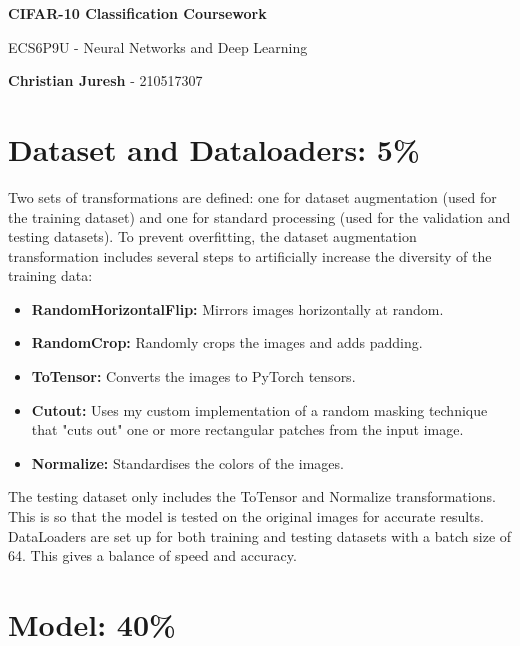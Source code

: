 \documentclass[12pt]{article}
\begin{document}
   \begin{center}
    \vspace{1.5cm}
    \vfill
       \Huge
       \textbf{CIFAR-10 Classification Coursework}

       \vspace{0.5cm}
       \LARGE
       ECS6P9U - Neural Networks and Deep Learning
        
       \large
       \vspace{0.5cm}
       \textbf{Christian Juresh} - 210517307
       \vspace{1.5cm}
   \end{center}
\section{Dataset and Dataloaders: 5\%}

Two sets of transformations are defined: one for dataset augmentation (used for the training dataset) and one for standard processing (used for the validation and testing datasets). To prevent overfitting, the dataset augmentation transformation includes several steps to artificially increase the diversity of the training data:

\begin{itemize}
\item \textbf{RandomHorizontalFlip:} Mirrors images horizontally at random.

\item \textbf{RandomCrop:} Randomly crops the images and adds padding.

\item \textbf{ToTensor:} Converts the images to PyTorch tensors.

\item \textbf{Cutout:} Uses my custom implementation of a random masking technique that "cuts out" one or more rectangular patches from the input image. 

\item \textbf{Normalize:} Standardises the colors of the images.
\end{itemize}
The testing dataset only includes the ToTensor and Normalize transformations. This is so that the model is tested on the original images for accurate results. DataLoaders are set up for both training and testing datasets with a batch size of 64. This gives a balance of speed and accuracy.

\section{Model: 40\%}
\end{document}

